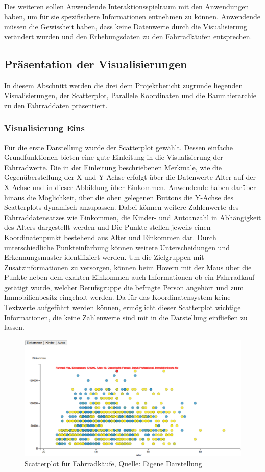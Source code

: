 \documentclass[usegeometry=true]{scrartcl}
\begin{document}
Des weiteren sollen Anwendende Interaktionsspielraum mit den Anwendungen haben, um für sie spezifischere Informationen entnehmen zu können. Anwendende müssen die Gewissheit haben, dass keine Datenwerte durch die Visualisierung verändert wurden und den Erhebungsdaten zu den Fahrradkäufen entsprechen. 
\subsection{Präsentation der Visualisierungen}
In diesem Abschnitt werden die drei dem Projektbericht zugrunde liegenden Visualisierungen, der Scatterplot, Parallele Koordinaten und die Baumhierarchie zu den Fahrraddaten präsentiert. 
\subsubsection{Visualisierung Eins}
Für die erste Darstellung wurde der Scatterplot gewählt. Dessen einfache Grundfunktionen bieten eine gute Einleitung in die Visualisierung der Fahrradwerte. Die in der Einleitung beschriebenen Merkmale, wie die Gegenüberstellung der X und Y Achse erfolgt über die Datenwerte Alter auf der X Achse und in dieser Abbildung über Einkommen. Anwendende haben darüber hinaus die Möglichkeit, über die oben gelegenen Buttons die Y-Achse des Scatterplots dynamisch anzupassen. Dabei können weitere Zahlenwerte des Fahrraddatensatzes wie  Einkommen, die Kinder- und Autoanzahl in Abhängigkeit des Alters dargestellt werden und Die Punkte stellen jeweils einen Koordinatenpunkt bestehend aus Alter und Einkommen dar. Durch unterschiedliche Punkteinfärbung können weitere Unterscheidungen und Erkennungsmuster identifiziert werden. 
Um die Zielgruppen mit Zusatzinformationen zu versorgen, können beim Hovern mit der Maus über die Punkte neben dem exakten Einkommen auch Informationen ob ein Fahrradkauf getätigt wurde, welcher Berufsgruppe die befragte Person angehört und zum Immobilienbesitz eingeholt werden.
Da für das Koordinatensystem keine Textwerte aufgeführt werden können, ermöglicht dieser Scatterplot wichtige Informationen, die keine Zahlenwerte sind mit in die Darstellung einfließen zu lassen.  
\begin{figure}[h]
\begin{center}
\includegraphics[width=16cm]{Bilder/V1Scatterplot.png}
\caption{Scatterplot für Fahrradkäufe, Quelle: Eigene Darstellung}
\end{center}
\end{figure}
\end{document}
